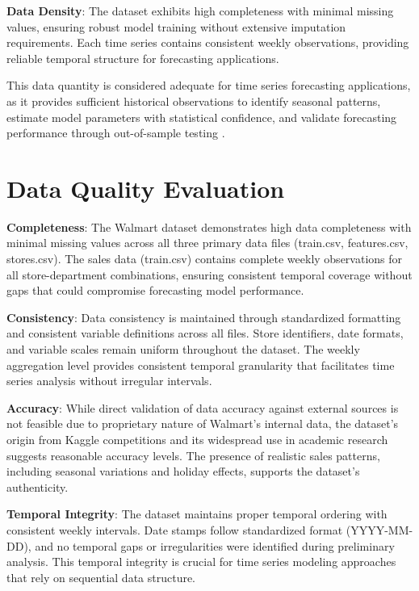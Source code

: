 \textbf{Data Density}: The dataset exhibits high completeness with minimal missing values, ensuring robust model training without extensive imputation requirements. Each time series contains consistent weekly observations, providing reliable temporal structure for forecasting applications.

This data quantity is considered adequate for time series forecasting applications, as it provides sufficient historical observations to identify seasonal patterns, estimate model parameters with statistical confidence, and validate forecasting performance through out-of-sample testing \cite{Pao:2017}.

\section{Data Quality Evaluation}

\textbf{Completeness}: The Walmart dataset demonstrates high data completeness with minimal missing values across all three primary data files (train.csv, features.csv, stores.csv). The sales data (train.csv) contains complete weekly observations for all store-department combinations, ensuring consistent temporal coverage without gaps that could compromise forecasting model performance.

\textbf{Consistency}: Data consistency is maintained through standardized formatting and consistent variable definitions across all files. Store identifiers, date formats, and variable scales remain uniform throughout the dataset. The weekly aggregation level provides consistent temporal granularity that facilitates time series analysis without irregular intervals.

\textbf{Accuracy}: While direct validation of data accuracy against external sources is not feasible due to proprietary nature of Walmart's internal data, the dataset's origin from Kaggle competitions and its widespread use in academic research suggests reasonable accuracy levels. The presence of realistic sales patterns, including seasonal variations and holiday effects, supports the dataset's authenticity.

\textbf{Temporal Integrity}: The dataset maintains proper temporal ordering with consistent weekly intervals. Date stamps follow standardized format (YYYY-MM-DD), and no temporal gaps or irregularities were identified during preliminary analysis. This temporal integrity is crucial for time series modeling approaches that rely on sequential data structure.


